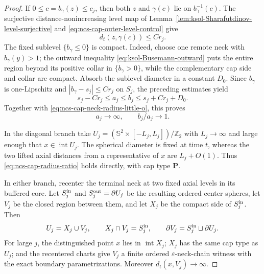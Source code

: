 \documentclass[10pt]{coll-l}
\newcommand{\Sph}{\mathbb{S}}
\theoremstyle{definition}
\theoremstyle{remark}
\numberwithin{section}{chapter}
\numberwithin{equation}{chapter}
\begin{document}
\begin{proof}
If $0\leq c=b_\gamma(z)\leq c_j$, then both $z$ and $\gamma(c)$ lie on
$b_\gamma^{-1}(c)$.  The surjective distance-nonincreasing level map of
Lemma~\ref{lem:ksol-Sharafutdinov-level-surjective} and
\eqref{eq:ncs-cap-outer-level-control} give
\begin{equation}
                  d_t(z,\gamma(c))\leq Cr_j.           \label{eq:ncs-cap-same-level-distance}
\end{equation}
The fixed sublevel $\{b_\gamma\leq0\}$ is compact.  Indeed, choose one
remote neck with $b_\gamma(y)>1$; the outward inequality
\eqref{eq:ksol-Busemann-outward} puts the entire region beyond its positive
collar in $\{b_\gamma>0\}$, while the complementary cap side and collar are
compact.  Absorb the sublevel diameter in a constant $D_0$.  Since
$b_\gamma$ is
one-Lipschitz and $|b_\gamma-s_j|\leq Cr_j$ on $S_j$, the preceding
estimates yield
\begin{equation}
 s_j-Cr_j\leq a_j\leq b_j
       \leq s_j+Cr_j+D_0.                              \label{eq:ncs-cap-two-radii-estimate}
\end{equation}
Together with \eqref{eq:ncs-cap-neck-radius-little-o}, this proves
\begin{equation}
                         a_j\longrightarrow\infty,\qquad
                         b_j/a_j\longrightarrow1.      \label{eq:ncs-cap-radius-ratio}
\end{equation}

In the diagonal branch take
$U_j=(\Sph^2\times[-L_j,L_j])/\mathbb Z_2$ with $L_j\to\infty$ and large
enough that $x\in\operatorname{int}U_j$.  The spherical diameter is fixed
at time $t$, whereas the two lifted axial distances from a representative
of $x$ are $L_j+O(1)$.  Thus
\eqref{eq:ncs-cap-radius-ratio} holds directly, with cap type $\mathbf P$.

In either branch, recenter the terminal neck at two fixed axial levels in
its buffered core.  Let $S_j^{\rm in}$ and $S_j^{\rm out}=\partial U_j$
be the resulting ordered center spheres, let $V_j$ be the closed region
between them, and let $X_j$ be the compact side of $S_j^{\rm in}$.  Then
\begin{equation}
 U_j=X_j\cup V_j,\qquad X_j\cap V_j=S_j^{\rm in},\qquad
 \partial V_j=S_j^{\rm in}\sqcup\partial U_j.         \label{eq:ncs-truncated-cap-exact-union}
\end{equation}
For large $j$, the distinguished point $x$ lies in
$\operatorname{int}X_j$; $X_j$ has the same cap type as $U_j$; and the
recentered charts give $V_j$ a finite ordered $\varepsilon$-neck-chain
witness with the exact boundary parametrizations.  Moreover
$d_t(x,V_j)\to\infty$.


\end{proof}
\end{document}
